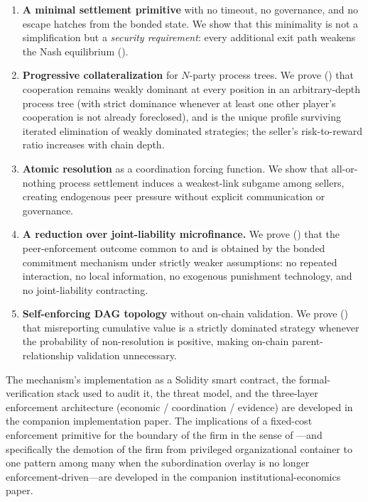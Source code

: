 \documentclass[11pt,a4paper]{article}
\theoremstyle{definition}
\theoremstyle{remark}
\begin{document}
\begin{enumerate}[label=(\roman*)]
  \item \textbf{A minimal settlement primitive} with no timeout, no
    governance, and no escape hatches from the bonded state. We show
    that this minimality is not a simplification but a \emph{security
    requirement}: every additional exit path weakens the Nash
    equilibrium ().

  \item \textbf{Progressive collateralization} for $N$-party process
    trees. We prove () that cooperation remains
    weakly dominant at every position in an arbitrary-depth process
    tree (with strict dominance whenever at least one other player's
    cooperation is not already foreclosed), and is the unique profile
    surviving iterated elimination of weakly dominated strategies;
    the seller's risk-to-reward ratio increases with chain depth.

  \item \textbf{Atomic resolution} as a coordination forcing function.
    We show that all-or-nothing process settlement induces a
    weakest-link subgame among sellers, creating endogenous peer
    pressure without explicit communication or governance.

  \item \textbf{A reduction over joint-liability microfinance.} We
    prove () that the
    peer-enforcement outcome common to \citet{ghatak1999} and
    \citet{stiglitz1990} is obtained by the bonded commitment
    mechanism under strictly weaker assumptions: no repeated
    interaction, no local information, no exogenous punishment
    technology, and no joint-liability contracting.

  \item \textbf{Self-enforcing DAG topology} without on-chain
    validation. We prove () that
    misreporting cumulative value is a strictly dominated strategy
    whenever the probability of non-resolution is positive,
    making on-chain parent-relationship validation unnecessary.

\end{enumerate}

The mechanism's implementation as a Solidity smart contract, the
formal-verification stack used to audit it, the threat model, and the
three-layer enforcement architecture (economic / coordination /
evidence) are developed in the companion implementation paper. The
implications of a fixed-cost enforcement primitive for the boundary
of the firm in the sense of \citet{coase1937}---and specifically the
demotion of the firm from privileged organizational container to one
pattern among many when the subordination overlay is no longer
enforcement-driven---are developed in the companion
institutional-economics paper.
\end{document}
